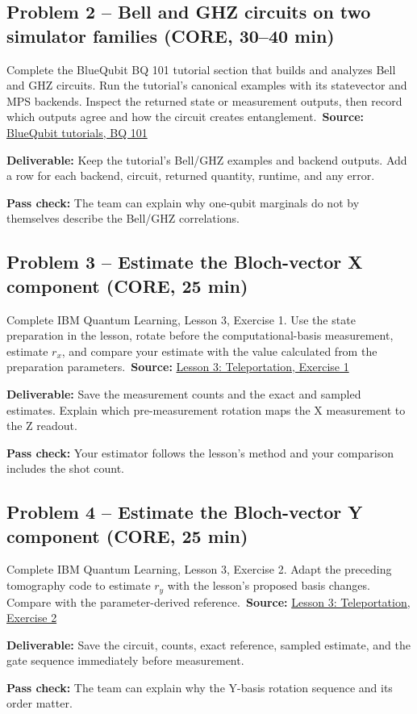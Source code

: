 \documentclass[11pt,letterpaper]{article}
\newcommand{\taskbox}[1]{\vspace{2pt}\noindent\colorbox{pale}{\parbox{\dimexpr\linewidth-2\fboxsep}{\textcolor{ink}{\textbf{Deliverable:} #1}}}\vspace{3pt}}
\newcommand{\pass}[1]{\textbf{Pass check:} #1}
\newcommand{\source}[2]{\textbf{Source:} \href{#1}{#2}}
\begin{document}
\subsection*{Problem 2 -- Bell and GHZ circuits on two simulator families (CORE, 30--40 min)}
Complete the BlueQubit BQ 101 tutorial section that builds and analyzes Bell and GHZ circuits. Run the tutorial's canonical examples with its statevector and MPS backends. Inspect the returned state or measurement outputs, then record which outputs agree and how the circuit creates entanglement.\
\source{https://app.bluequbit.io/tutorials}{BlueQubit tutorials, BQ 101}
\taskbox{Keep the tutorial's Bell/GHZ examples and backend outputs. Add a row for each backend, circuit, returned quantity, runtime, and any error.}
\pass{The team can explain why one-qubit marginals do not by themselves describe the Bell/GHZ correlations.}

\subsection*{Problem 3 -- Estimate the Bloch-vector X component (CORE, 25 min)}
Complete IBM Quantum Learning, Lesson 3, Exercise 1. Use the state preparation in the lesson, rotate before the computational-basis measurement, estimate \(r_x\), and compare your estimate with the value calculated from the preparation parameters.\
\source{https://learning.quantum.ibm.com/course/utility-scale-quantum-computing/lesson-03-teleportation}{Lesson 3: Teleportation, Exercise 1}
\taskbox{Save the measurement counts and the exact and sampled estimates. Explain which pre-measurement rotation maps the X measurement to the Z readout.}
\pass{Your estimator follows the lesson's method and your comparison includes the shot count.}

\subsection*{Problem 4 -- Estimate the Bloch-vector Y component (CORE, 25 min)}
Complete IBM Quantum Learning, Lesson 3, Exercise 2. Adapt the preceding tomography code to estimate \(r_y\) with the lesson's proposed basis changes. Compare with the parameter-derived reference.\
\source{https://learning.quantum.ibm.com/course/utility-scale-quantum-computing/lesson-03-teleportation}{Lesson 3: Teleportation, Exercise 2}
\taskbox{Save the circuit, counts, exact reference, sampled estimate, and the gate sequence immediately before measurement.}
\pass{The team can explain why the Y-basis rotation sequence and its order matter.}
\end{document}
